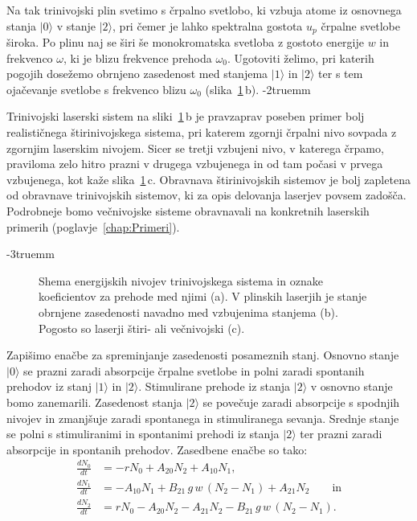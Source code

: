 Na tak trinivojski plin svetimo s črpalno svetlobo, ki vzbuja atome iz osnovnega stanja 
$|0\rangle$ v stanje $|2\rangle$, pri čemer je lahko spektralna gostota $u_{p}$ črpalne 
svetlobe široka. Po plinu naj se širi še monokromatska svetloba z gostoto 
energije $w$ in frekvenco $\omega$, ki je blizu frekvence prehoda $\omega_{0}$. 
Ugotoviti želimo, pri katerih pogojih  dosežemo obrnjeno zasedenost med 
stanjema $|1\rangle$ in $|2\rangle$ ter s tem ojačevanje svetlobe s frekvenco blizu
$\omega_{0}$ (slika~\ref{fig:3nivojski}\,b).
\vglue-2truemm
\begin{remark}
Trinivojski laserski sistem na sliki~\ref{fig:3nivojski}\,b je pravzaprav 
poseben primer bolj realističnega štiri\-nivojskega sistema, 
pri katerem zgornji črpalni nivo sovpada z zgornjim laserskim nivojem. Sicer se tretji vzbujeni nivo, 
v katerega črpamo, praviloma zelo hitro prazni v drugega vzbujenega in od tam počasi v prvega vzbujenega, 
kot kaže slika~\ref{fig:3nivojski}\,c.
Obravnava štirinivojskih sistemov je bolj zapletena od obravnave trinivojskih sistemov, 
ki za opis delovanja laserjev povsem zadošča. Podrobneje bomo večnivojske sisteme 
obravnavali na konkretnih laserskih primerih (poglavje~\ref{chap:Primeri}).
\end{remark}
\vglue-3truemm
\begin{figure}[ht]
\centering
\def\svgwidth{118truemm} 

\caption{Shema energijskih nivojev trinivojskega sistema in oznake koeficientov za prehode
med njimi (a). V plinskih laserjih je stanje obrnjene zasedenosti navadno med vzbujenima 
stanjema (b). Pogosto so laserji štiri- ali večnivojski (c).}
\label{fig:3nivojski}
\end{figure}
Zapišimo enačbe za spreminjanje zasedenosti posameznih stanj. Osnovno stanje
$|0\rangle$ se prazni zaradi absorpcije črpalne svetlobe in polni zaradi
spontanih prehodov iz stanj $|1\rangle$ in $|2\rangle$. Stimulirane
prehode iz stanja $|2\rangle$ v osnovno stanje bomo zanemarili. Zasedenost stanja $|2\rangle$ se
povečuje zaradi absorpcije s spodnjih nivojev in zmanjšuje
zaradi spontanega in stimuliranega sevanja. Srednje stanje se polni
s stimuliranimi in spontanimi prehodi iz stanja $|2\rangle$ ter prazni
zaradi absorpcije in spontanih prehodov.
Zasedbene enačbe so tako:
\begin{align}
\frac{dN_{0}}{dt} & =  -rN_0+A_{20}N_{2}+A_{10}N_{1}, \label{4.39.1}\\
\frac{dN_{1}}{dt} & =  -A_{10}N_{1}+B_{21}\,g\,w\, (N_{2}-N_{1})+A_{21}N_{2} \label{4.39.2} \qquad \mathrm{in}\\
\frac{dN_{2}}{dt} & =  rN_0-A_{20}N_{2}-A_{21}N_{2}-B_{21}\,g\,w\, (N_2-N_1).
\label{4.39}
\end{align}

